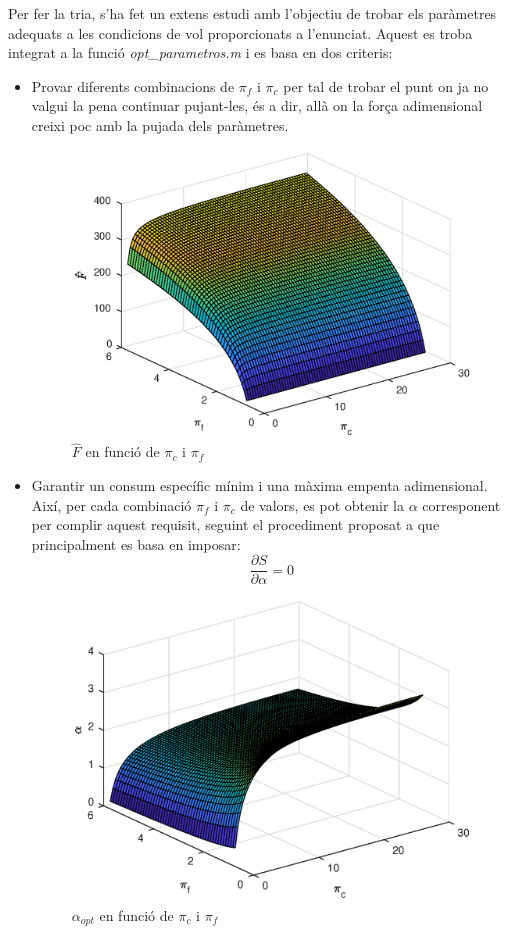 Per fer la tria,  s'ha fet un extens estudi amb l'objectiu de trobar els paràmetres adequats a les condicions de vol proporcionats a l'enunciat. Aquest es troba integrat a la funció \textit{opt\_parametros.m} i es basa en dos criteris:
\begin{itemize}
\item Provar diferents combinacions de $\pi_f$ i $\pi_c$ per tal de trobar el punt on ja no valgui la pena continuar pujant-les, és a dir, allà on la força adimensional creixi poc amb la pujada dels paràmetres.
\begin{figure}[H]
	\centering
	\includegraphics[scale=0.6]{./pics/F_pc_pf}
	\caption{\(\hat{F}\) en funció de $\pi_c$ i $\pi_f$}
\end{figure}
\item Garantir un consum específic mínim i una màxima empenta adimensional. Així, per cada combinació  $\pi_f$ i $\pi_c$ de valors, es pot obtenir la $\alpha$ corresponent per complir aquest requisit, seguint el procediment proposat a \cite[5-10]{mattingly} que principalment es basa en imposar:
\begin{equation*}
	\frac{\partial S}{\partial \alpha} = 0 
\end{equation*}
\begin{figure}[H]
	\centering
	\includegraphics[scale=0.6]{./pics/alpha_pc_pf}
	\caption{$\alpha_{opt}$ en funció de $\pi_c$ i $\pi_f$}
\end{figure}
\end{itemize}
